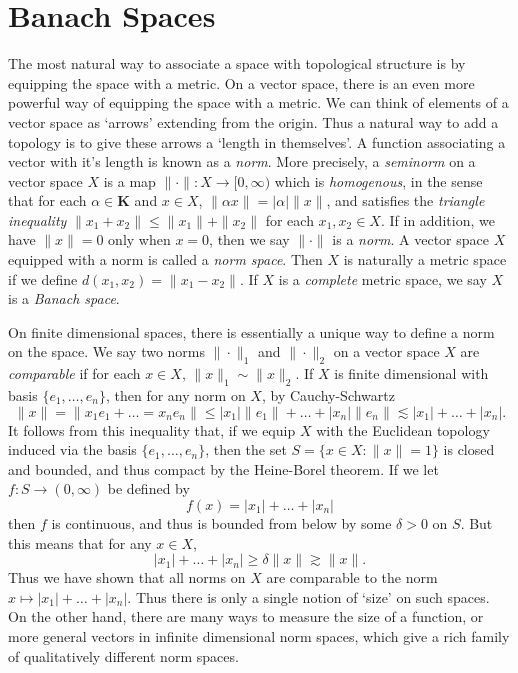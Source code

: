 \chapter{Banach Spaces}

The most natural way to associate a space with topological structure is by equipping the space with a metric. On a vector space, there is an even more powerful way of equipping the space with a metric. We can think of elements of a vector space as `arrows' extending from the origin. Thus a natural way to add a topology is to give these arrows a `length in themselves'. A function associating a vector with it's length is known as a {\it norm}. More precisely, a \emph{seminorm} on a vector space $X$ is a map $\| \cdot \|: X \to [0,\infty)$ which is {\it homogenous}, in the sense that for each $\alpha \in \mathbf{K}$ and $x \in X$, $\| \alpha x \| = |\alpha| \| x \|$, and satisfies the {\it triangle inequality} $\| x_1 + x_2 \| \leq \| x_1 \| + \| x_2 \|$ for each $x_1,x_2 \in X$. If in addition, we have $\| x \| = 0$ only when $x = 0$, then we say $\| \cdot \|$ is a {\it norm}. A vector space $X$ equipped with a norm is called a {\it norm space}. Then $X$ is naturally a metric space if we define $d(x_1,x_2) = \| x_1 - x_2 \|$. If $X$ is a \emph{complete} metric space, we say $X$ is a \emph{Banach space}.

On finite dimensional spaces, there is essentially a unique way to define a norm on the space. We say two norms $\| \cdot \|_1$ and $\| \cdot \|_2$ on a vector space $X$ are {\it comparable} if for each $x \in X$, $\| x \|_1 \sim \| x \|_2$. If $X$ is finite dimensional with basis $\{ e_1,\dots,e_n \}$, then for any norm on $X$, by Cauchy-Schwartz
%
\[ \| x \| = \| x_1 e_1 + \dots = x_n e_n \| \leq |x_1| \| e_1 \| + \dots + |x_n| \| e_n \| \lesssim |x_1| + \dots + |x_n|. \]
%
It follows from this inequality that, if we equip $X$ with the Euclidean topology induced via the basis $\{ e_1, \dots, e_n \}$, then the set $S = \{ x \in X : \| x \| = 1 \}$ is closed and bounded, and thus compact by the Heine-Borel theorem. If we let $f: S \to (0,\infty)$ be defined by
%
\[ f(x) = |x_1| + \dots + |x_n| \]
%
then $f$ is continuous, and thus is bounded from below by some $\delta > 0$ on $S$. But this means that for any $x \in X$,
%
\[ |x_1| + \dots + |x_n| \geq \delta \| x \| \gtrsim \| x \|. \]
%
Thus we have shown that all norms on $X$ are comparable to the norm $x \mapsto |x_1| + \dots + |x_n|$. Thus there is only a single notion of `size' on such spaces. On the other hand, there are many ways to measure the size of a function, or more general vectors in infinite dimensional norm spaces, which give a rich family of qualitatively different norm spaces.

